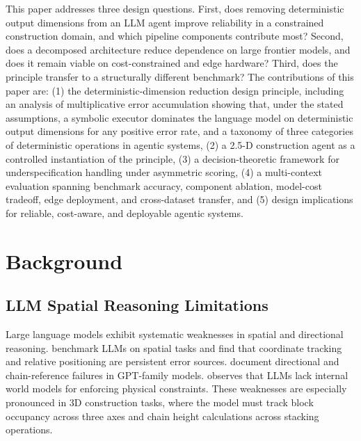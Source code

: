 \documentclass[10pt]{article}
\begin{document}
This paper addresses three design questions. First, does removing
deterministic output dimensions from an LLM agent improve reliability
in a constrained construction domain, and which pipeline components
contribute most? Second, does a decomposed architecture reduce dependence
on large frontier models, and does it remain viable on cost-constrained
and edge hardware? Third, does the principle transfer to a structurally
different benchmark?
The contributions of this paper are: (1) the deterministic-dimension
reduction design principle, including an analysis of multiplicative
error accumulation showing that, under the stated assumptions, a symbolic
executor dominates the language model on deterministic output dimensions
for any positive error rate, and a taxonomy of three categories of
deterministic operations
in agentic systems, (2) a 2.5-D construction agent as a controlled
instantiation of the principle, (3) a decision-theoretic framework for
underspecification handling under asymmetric scoring, (4) a multi-context
evaluation spanning benchmark accuracy, component ablation, model-cost
tradeoff, edge deployment, and cross-dataset transfer, and (5) design
implications for reliable, cost-aware, and deployable agentic systems.

\section{Background}

\subsection{LLM Spatial Reasoning Limitations}
Large language models exhibit systematic weaknesses in spatial and
directional reasoning. \textcite{yamada2024} benchmark LLMs on spatial
tasks and find that coordinate tracking and relative positioning are
persistent error sources. \textcite{bang2023} document directional and
chain-reference failures in GPT-family models. \textcite{lecun2022}
observes that LLMs lack internal world models for enforcing physical
constraints. These weaknesses are especially pronounced in 3D construction
tasks, where the model must track block occupancy across three axes and
chain height calculations across stacking operations.
\end{document}

